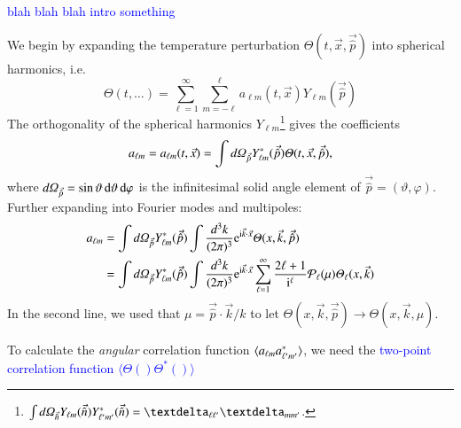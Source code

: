 \textcolor{blue}{blah blah blah intro something}


We begin by expanding the temperature perturbation $\Theta(t, \vec{x}, \vec{\hat{p}})$ into spherical harmonics, i.e.
\begin{equation}
    \Theta(t, \dots) = \sum_{\ell=1}^{\infty} \sum_{m=-\ell}^{\ell} a_{\ell m}(t, \vec{x}) Y_{\ell m} (\vec{\hat{p}})
\end{equation}
The orthogonality of the spherical harmonics $Y_{\ell m}$\footnote{$\int \dOmg[n] Y\ellm(\vec{\hat{n}}) Y\ellmp^*(\vec{\hat{n}}) = \deltasym{\ell \ell'} \deltasym{m m'} $.} gives the coefficients
\begin{equation}
    a\ellm = a\ellm(t,\vec{x}) = \int \dOmg[p] Y^*_{\ell m} (\vec{\hat{p}}) \Theta(t, \vec{x}, \vec{\hat{p}}),
\end{equation}
where $d\varOmega_{\vec{\hat{p}}} = \sin{\vartheta} \diff \vartheta\diff \varphi$ is the infinitesimal solid angle element of $\vec{\hat{p}} = (\vartheta, \varphi)$. Further expanding into Fourier modes and multipoles:
\begin{equation}
\begin{split}
    a_{\ell m} &= \int \dOmg[p] Y^*_{\ell m} (\vec{\hat{p}}) \int \frac{d^3 k}{(2\pi)^3} \eu[\im \vec{k}\cdot \vec{x}] \Theta(x, \vec{k}, \vec{\hat{p}})  \\
    &= \int \dOmg[p] Y^*_{\ell m} (\vec{\hat{p}}) \int \frac{d^3 k}{(2\pi)^3} \eu[\im \vec{k}\cdot \vec{x}]\sum_{{\ell=1}}^{\infty} \frac{2\ell + 1}{\im^\ell} \mathcal{P}_\ell(\mu) \Theta_\ell(x, \vec{k})
\end{split}
\end{equation}
In the second line, we used that $\mu=\vec{\hat{p}}\cdot\vec{k}/k$ to let $\Theta(x,\vec{k}, \vec{\hat{p}}) \to\Theta(x,\vec{k},\mu) $.


To calculate the \textit{angular} correlation function $\langle a\ellm a^*\ellmp \rangle$, we need the \textcolor{blue}{two-point correlation function $\langle \Theta() \Theta^*()\rangle$} 



